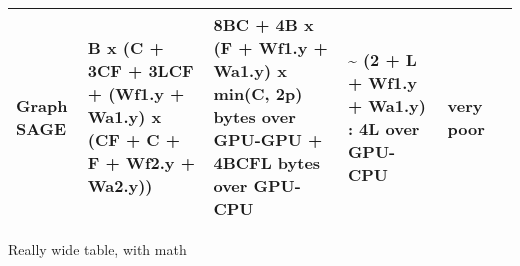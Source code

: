 \documentclass[10pt,oneside]{memoir}
\begin{document}
\begin{longtable}[]{@{}llllll@{}}
\begin{minipage}[t]{0.19\columnwidth}\raggedright
Graph SAGE\strut
\end{minipage} & \begin{minipage}[t]{0.10\columnwidth}\raggedright
B x (C + 3CF + 3LCF + (Wf1.y + Wa1.y) x (CF + C + F + Wf2.y +
Wa2.y))\strut
\end{minipage} & \begin{minipage}[t]{0.13\columnwidth}\raggedright
8BC + 4B x (F + Wf1.y + Wa1.y) x min(C, 2p) bytes over GPU-GPU + 4BCFL
bytes over GPU-CPU\strut
\end{minipage} & \begin{minipage}[t]{0.19\columnwidth}\raggedright
\textasciitilde{} (2 + L + Wf1.y + Wa1.y) : 4L over GPU-CPU\strut
\end{minipage} & \begin{minipage}[t]{0.11\columnwidth}\raggedright
very poor\strut
\end{minipage} & \begin{minipage}[t]{0.12\columnwidth}\raggedright
\strut
\end{minipage}\tabularnewline
\bottomrule
\end{longtable}

Really wide table, with math
\end{document}
